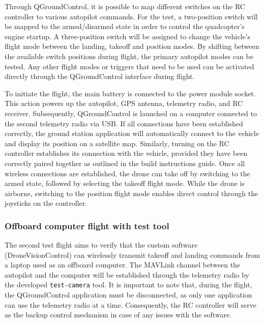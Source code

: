 Through QGroundControl, it is possible to map different switches on the RC controller to various autopilot commands. For the test, a two-position switch will be mapped to the armed/disarmed state in order to control the quadcopter's engine startup. A three-position switch will be assigned to change the vehicle's flight mode between the landing, takeoff and position modes. By shifting between the available switch positions during flight, the primary autopilot modes can be tested. Any other flight modes or triggers that need to be used can be activated directly through the QGroundControl interface during flight.



To initiate the flight, the main battery is connected to the power module socket. This action powers up the autopilot, GPS antenna, telemetry radio, and RC receiver. Subsequently, QGroundControl is launched on a computer connected to the second telemetry radio via USB. If all connections have been established correctly, the ground station application will automatically connect to the vehicle and display its position on a satellite map. Similarly, turning on the RC controller establishes its connection with the vehicle, provided they have been correctly paired together as outlined in the build instructions guide. Once all wireless connections are established, the drone can take off by switching to the armed state, followed by selecting the takeoff flight mode. While the drone is airborne, switching to the position flight mode enables direct control through the joysticks on the controller.


\subsubsection{Offboard computer flight with test tool}
\label{subsec:fl-test-2}

The second test flight aims to verify that the custom software (DroneVisionControl) can wirelessly transmit takeoff and landing commands from a laptop used as an offboard computer. The MAVLink channel between the autopilot and the computer will be established through the telemetry radio by the developed \texttt{test-camera} tool. It is important to note that, during the flight, the QGroundControl application must be disconnected, as only one application can use the telemetry radio at a time. Consequently, the RC controller will serve as the backup control mechanism in case of any issues with the software. 

